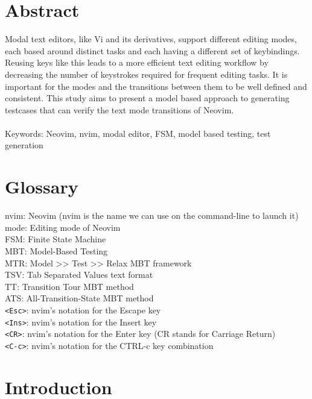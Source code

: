 \documentclass[12pt]{article}
\begin{document}

\tableofcontents
\cleardoublepage



\section{Abstract}
	Modal text editors, like Vi and its derivatives, support different editing modes, each based around distinct tasks and each having a different set of keybindings. Reusing keys like this leads to a more efficient text editing workflow by decreasing the number of keystrokes required for frequent editing tasks. It is important for the modes and the transitions between them to be well defined and consistent. This study aims to present a model based approach to generating testcases that can verify the text mode transitions of Neovim.
	\\
	\\
	Keywords: Neovim, nvim, modal editor, FSM, model based testing, test generation

\section{Glossary}
	nvim: Neovim (nvim is the name we can use on the command-line to launch it)\\
	mode: Editing mode of Neovim\\
	FSM: Finite State Machine\\
	MBT: Model-Based Testing\\
	MTR: Model >> Test >> Relax MBT framework\\
	TSV: Tab Separated Values text format\\
	TT: Transition Tour MBT method\\
	ATS: All-Transition-State MBT method\\
	\verb|<Esc>|: nvim's notation for the Escape key\\
	\verb|<Ins>|: nvim's notation for the Insert key\\
	\verb|<CR>|: nvim's notation for the Enter key (CR stands for Carriage Return)\\
	\verb|<C-c>|: nvim's notation for the CTRL-c key combination

\section{Introduction}
\end{document}
